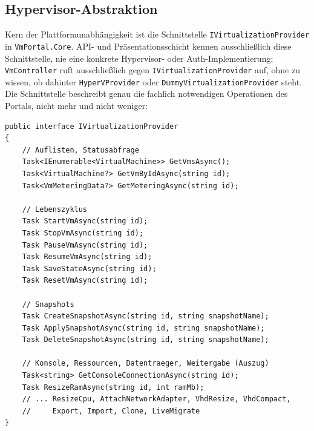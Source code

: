\documentclass[12pt,a4paper]{article}
\begin{document}
\subsection{Hypervisor-Abstraktion}
\label{sec:hypervisor-abstraktion}

Kern der Plattformunabhängigkeit ist die Schnittstelle \texttt{IVirtualizationProvider} in \texttt{VmPortal.Core}. API- und Präsentationsschicht kennen ausschließlich diese Schnittstelle, nie eine konkrete Hypervisor- oder Auth-Implementierung; \texttt{VmController} ruft ausschließlich gegen \texttt{IVirtualizationProvider} auf, ohne zu wissen, ob dahinter \texttt{HyperVProvider} oder \texttt{DummyVirtualizationProvider} steht. Die Schnittstelle beschreibt genau die fachlich notwendigen Operationen des Portals, nicht mehr und nicht weniger:

\begin{lstlisting}[language={[Sharp]C}, caption={Die zentrale Hypervisor-Abstraktion \texttt{IVirtualizationProvider} (Kurzform; vollständig vgl.\ Tabelle~\ref{tab:proxmox-mapping} bzw.\ Tabelle~\ref{tab:vmactions})}, label={lst:provider}]
public interface IVirtualizationProvider
{
    // Auflisten, Statusabfrage
    Task<IEnumerable<VirtualMachine>> GetVmsAsync();
    Task<VirtualMachine?> GetVmByIdAsync(string id);
    Task<VmMeteringData?> GetMeteringAsync(string id);

    // Lebenszyklus
    Task StartVmAsync(string id);
    Task StopVmAsync(string id);
    Task PauseVmAsync(string id);
    Task ResumeVmAsync(string id);
    Task SaveStateAsync(string id);
    Task ResetVmAsync(string id);

    // Snapshots
    Task CreateSnapshotAsync(string id, string snapshotName);
    Task ApplySnapshotAsync(string id, string snapshotName);
    Task DeleteSnapshotAsync(string id, string snapshotName);

    // Konsole, Ressourcen, Datentraeger, Weitergabe (Auszug)
    Task<string> GetConsoleConnectionAsync(string id);
    Task ResizeRamAsync(string id, int ramMb);
    // ... ResizeCpu, AttachNetworkAdapter, VhdResize, VhdCompact,
    //     Export, Import, Clone, LiveMigrate
}
\end{lstlisting}
\end{document}
